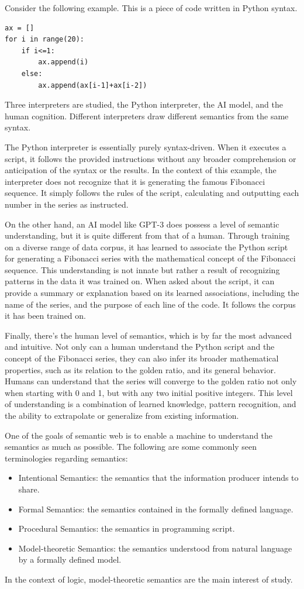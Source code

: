Consider the following example. This is a piece of code written in Python syntax.
\begin{lstlisting}
ax = []
for i in range(20):
	if i<=1:
		ax.append(i)
	else:
		ax.append(ax[i-1]+ax[i-2])
\end{lstlisting}
Three interpreters are studied, the Python interpreter, the AI model, and the human cognition. Different interpreters draw different semantics from the same syntax.

The Python interpreter is essentially purely syntax-driven. When it executes a script, it follows the provided instructions without any broader comprehension or anticipation of the syntax or the results. In the context of this example, the interpreter does not recognize that it is generating the famous Fibonacci sequence. It simply follows the rules of the script, calculating and outputting each number in the series as instructed.

On the other hand, an AI model like GPT-3 does possess a level of semantic understanding, but it is quite different from that of a human. Through training on a diverse range of data corpus, it has learned to associate the Python script for generating a Fibonacci series with the mathematical concept of the Fibonacci sequence. This understanding is not innate but rather a result of recognizing patterns in the data it was trained on. When asked about the script, it can provide a summary or explanation based on its learned associations, including the name of the series, and the purpose of each line of the code. It follows the corpus it has been trained on.

Finally, there's the human level of semantics, which is by far the most advanced and intuitive. Not only can a human understand the Python script and the concept of the Fibonacci series, they can also infer its broader mathematical properties, such as its relation to the golden ratio, and its general behavior. Humans can understand that the series will converge to the golden ratio not only when starting with 0 and 1, but with any two initial positive integers. This level of understanding is a combination of learned knowledge, pattern recognition, and the ability to extrapolate or generalize from existing information.

One of the goals of semantic web is to enable a machine to understand the semantics as much as possible. The following are some commonly seen terminologies regarding semantics:
\begin{itemize}
  \item Intentional Semantics: the semantics that the information producer intends to share.
  \item Formal Semantics: the semantics contained in the formally defined language.
  \item Procedural Semantics: the semantics in programming script.
  \item Model-theoretic Semantics: the semantics understood from natural language by a formally defined model.
\end{itemize}
In the context of logic, model-theoretic semantics are the main interest of study.


